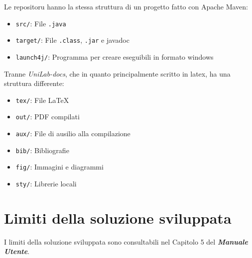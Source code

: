 Le repositoru hanno la stessa struttura di un progetto fatto con Apache Maven:

\begin{itemize}
	\item \texttt{src/}: File \texttt{.java}
	\item \texttt{target/}: File \texttt{.class}, \texttt{.jar} e javadoc
	\item \texttt{launch4j/}: Programma per creare eseguibili in formato windows
\end{itemize}

Tranne \textsl{UniLab-docs}, che in quanto principalmente scritto in latex, ha una struttura differente:

\begin{itemize}
	\item \texttt{tex/}: File \LaTeX
	\item \texttt{out/}: PDF compilati
	\item \texttt{aux/}: File di ausilio alla compilazione
	\item \texttt{bib/}: Bibliografie
	\item \texttt{fig/}: Immagini e diagrammi
	\item \texttt{sty/}: Librerie locali
\end{itemize}


\chapter{Limiti della soluzione sviluppata}
I limiti della soluzione sviluppata sono consultabili nel Capitolo 5 del \textit{\textbf{Manuale Utente}}.

\nocite{IuriTex}


